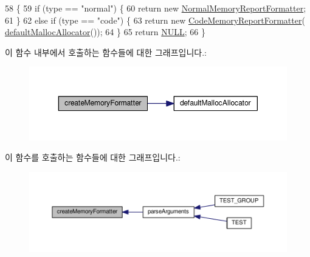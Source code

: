 \begin{DoxyCode}
58 \{
59     \textcolor{keywordflow}{if} (type == \textcolor{stringliteral}{"normal"}) \{
60         \textcolor{keywordflow}{return}  \textcolor{keyword}{new} \hyperlink{class_normal_memory_report_formatter}{NormalMemoryReportFormatter};
61     \}
62     \textcolor{keywordflow}{else} \textcolor{keywordflow}{if} (type == \textcolor{stringliteral}{"code"}) \{
63         \textcolor{keywordflow}{return} \textcolor{keyword}{new} \hyperlink{class_code_memory_report_formatter}{CodeMemoryReportFormatter}(
      \hyperlink{_test_memory_allocator_8h_aa72576600a0bfbfecf0497d116d3e34e}{defaultMallocAllocator}());
64     \}
65     \textcolor{keywordflow}{return} \hyperlink{openavb__types__base__pub_8h_a070d2ce7b6bb7e5c05602aa8c308d0c4}{NULL};
66 \}
\end{DoxyCode}


이 함수 내부에서 호출하는 함수들에 대한 그래프입니다.\+:
\nopagebreak
\begin{figure}[H]
\begin{center}
\leavevmode
\includegraphics[width=350pt]{class_memory_reporter_plugin_a36999696bcd440611677b026a0bac5d8_cgraph}
\end{center}
\end{figure}




이 함수를 호출하는 함수들에 대한 그래프입니다.\+:
\nopagebreak
\begin{figure}[H]
\begin{center}
\leavevmode
\includegraphics[width=350pt]{class_memory_reporter_plugin_a36999696bcd440611677b026a0bac5d8_icgraph}
\end{center}
\end{figure}


